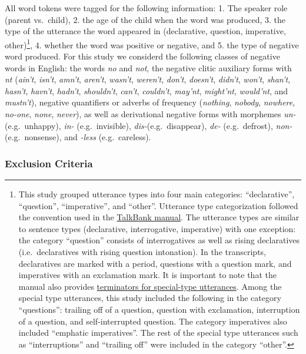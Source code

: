 \documentclass[man]{apa6}
\let\rmarkdownfootnote\footnote%
\def\footnote{\protect\rmarkdownfootnote}
\begin{document}
All word tokens were tagged for the following information: 1. The
speaker role (parent vs.~child), 2. the age of the child when the word
was produced, 3. the type of the utterance the word appeared in
(declarative, question, imperative, other)\footnote{This study grouped
  utterance types into four main categories: \enquote{declarative},
  \enquote{question}, \enquote{imperative}, and \enquote{other}.
  Utterance type categorization followed the convention used in the
  \href{https://talkbank.org/manuals/CHAT.html\#_Toc486414422}{TalkBank
  manual}. The utterance types are similar to sentence types
  (declarative, interrogative, imperative) with one exception: the
  category \enquote{question} consists of interrogatives as well as
  rising declaratives (i.e.~declaratives with rising question
  intonation). In the transcripts, declaratives are marked with a
  period, questions with a question mark, and imperatives with an
  exclamation mark. It is important to note that the manual also
  provides
  \href{https://talkbank.org/manuals/CHAT.html\#_Toc486414431}{terminators
  for special-type utterances}. Among the special type utterances, this
  study included the following in the category \enquote{questions}:
  trailing off of a question, question with exclamation, interruption of
  a question, and self-interrupted question. The category imperatives
  also included \enquote{emphatic imperatives}. The rest of the special
  type utterances such as \enquote{interruptions} and \enquote{trailing
  off} were included in the category \enquote{other}.}, 4. whether the
word was positive or negative, and 5. the type of negative word
produced. For this study we considerd the following classes of negative
words in English: the words \emph{no} and \emph{not}, the negative
clitic auxiliary forms with \emph{nt} (\emph{ain't}, \emph{isn't},
\emph{amn't}, \emph{aren't}, \emph{wasn't}, \emph{weren't},
\emph{don't}, \emph{doesn't}, \emph{didn't}, \emph{won't},
\emph{shan't}, \emph{hasn't}, \emph{havn't}, \emph{hadn't},
\emph{shouldn't}, \emph{can't}, \emph{couldn't}, \emph{may'nt},
\emph{might'nt}, \emph{would'nt}, and \emph{mustn't}), negative
quantifiers or adverbs of frequency (\emph{nothing}, \emph{nobody},
\emph{nowhere}, \emph{no-one}, \emph{none}, \emph{never}), as well as
derivational negative forms with morphemes \emph{un-} (e.g.~unhappy),
\emph{in-} (e.g.~invisible), \emph{dis-}(e.g.~disappear), \emph{de-}
(e.g.~defrost), \emph{non-} (e.g.~nonsense), and \emph{-less}
(e.g.~careless).

\subsubsection{Exclusion Criteria}\label{exclusion-criteria}
\end{document}

